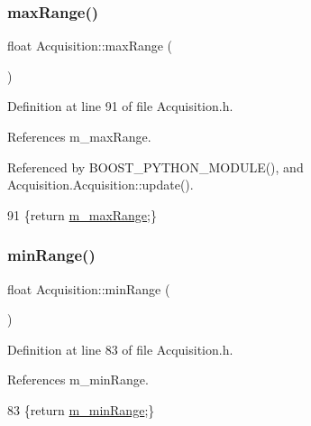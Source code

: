 \subsubsection{\texorpdfstring{max\+Range()}{maxRange()}\hspace{0.1cm}{\footnotesize\ttfamily [2/2]}}
{\footnotesize\ttfamily float Acquisition\+::max\+Range (\begin{DoxyParamCaption}{ }\end{DoxyParamCaption})\hspace{0.3cm}{\ttfamily [inline]}}



Definition at line 91 of file Acquisition.\+h.



References m\+\_\+max\+Range.



Referenced by B\+O\+O\+S\+T\+\_\+\+P\+Y\+T\+H\+O\+N\+\_\+\+M\+O\+D\+U\+L\+E(), and Acquisition.\+Acquisition\+::update().


\begin{DoxyCode}
91 \{\textcolor{keywordflow}{return} \hyperlink{classAcquisition_a45478629e9db582470b4b158edb46616}{m\_maxRange};\}
\end{DoxyCode}
\mbox{\label{classAcquisition_a44f441710231748d2ca8f691647b2bcd}} 
\subsubsection{\texorpdfstring{min\+Range()}{minRange()}\hspace{0.1cm}{\footnotesize\ttfamily [1/2]}}
{\footnotesize\ttfamily float Acquisition\+::min\+Range (\begin{DoxyParamCaption}{ }\end{DoxyParamCaption})\hspace{0.3cm}{\ttfamily [inline]}}



Definition at line 83 of file Acquisition.\+h.



References m\+\_\+min\+Range.


\begin{DoxyCode}
83 \{\textcolor{keywordflow}{return} \hyperlink{classAcquisition_a06b3ea027ebdcb15f64a6517ceb99b76}{m\_minRange};\}
\end{DoxyCode}
\mbox{\label{classAcquisition_a44f441710231748d2ca8f691647b2bcd}} 

